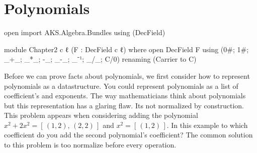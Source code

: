 \documentclass[./Thesis.tex]{subfiles}
\begin{document}
\chapter{Polynomials}
\label{chap:polynomials}

\begin{code}[hide]
open import AKS.Algebra.Bundles using (DecField)
\end{code}
\begin{code}
module Chapter2 {c ℓ} (F : DecField c ℓ) where
  open DecField F
    using (0#; 1#; _+_; _*_; -_; _-_; _⁻¹; _/_; C/0)
    renaming (Carrier to C)
\end{code}

Before we can prove facts about polynomials, we first consider how to represent
polynomials as a datastructure. You could represent polynomials as a list of
coefficient's and exponents. The way mathematicians think about polynomials but
this representation has a glaring flaw. Its not normalized by construction. This
problem appears when considering adding the polynomial
$x^2 + 2x^2 = [ \, (1, 2), \, (2, 2) \, ]$ 
and $x^2 = [ \, (1, 2) \, ]$. In this example to which coefficient do you add
the second polynomial's coefficient? The common solution to this problem is too
normalize before every operation. 
\end{document}
